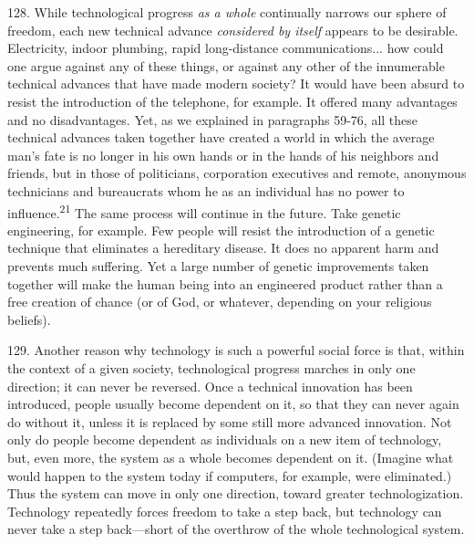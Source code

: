 \documentclass{article}
\begin{document}
128.  While technological progress \textit{as a whole} continually narrows our sphere of  freedom, each 
new technical advance \textit{considered by itself} appears to be desirable.  Electricity, indoor plumbing, 
rapid long-distance communications... how could one argue against any of these things, or against 
any other of the innumerable technical advances that have made modern society? It would have 
been absurd to resist the introduction of the telephone, for example.  It offered many advantages 
and  no  disadvantages.   Yet,  as  we  explained  in  paragraphs  59-76,  all  these  technical  advances  
taken together have created a world in which the average man’s fate is no longer in his own hands 
or in the hands of his neighbors and friends, but in those of politicians, corporation executives and 
remote,  anonymous  technicians  and  bureaucrats  whom  he  as  an  individual  has  no  power  to  
influence.\textsuperscript{21} The  same  process  will  continue  in  the  future.   Take genetic  engineering,  for  
example.  Few people will resist the introduction of a genetic technique that eliminates a hereditary 
disease.   It does no  apparent harm and prevents  much suffering.  Yet a large number of  genetic 
improvements taken together will make the human being into an engineered product rather than a 
free creation of chance (or of God, or whatever, depending on your religious beliefs). \vspace{\baselineskip}

129.  Another reason why technology is such a powerful social force is that, within the context of 
a given society, technological progress marches in only one direction; it can never be 
reversed.  Once a technical innovation has been introduced, people usually become dependent on 
it,  so  that  they  can  never  again  do  without  it,  unless  it  is  replaced  by  some  still  more  advanced  
innovation.  Not only do people become dependent as individuals on a new item of technology, 
but, even more, the system as a whole becomes dependent on it.  (Imagine what would happen to 
the system today if computers, for example, were eliminated.) Thus the system can move in only 
one direction, toward greater technologization.  Technology repeatedly forces freedom to take a 
step  back,  but  technology  can  never  take  a  step  back—short  of  the  overthrow  of  the  whole  
technological system. \vspace{\baselineskip}
\end{document}
